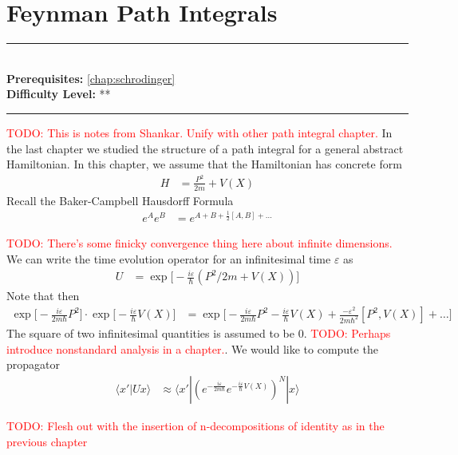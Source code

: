 \documentclass[book.tex]{subfiles}
\begin{document}
\chapter{Feynman Path Integrals}

\label{chap:path_integrals}
\noindent\rule{11cm}{0.4pt} \\
\textbf{Prerequisites:}  \autoref{chap:schrodinger} \\
\textbf{Difficulty Level:} ** \\
\noindent\rule{11cm}{0.4pt}
\vspace{5mm}

\textcolor{red}{TODO: This is notes from Shankar. Unify with other path integral chapter.}
In the last chapter we studied the structure of a path integral for a general abstract Hamiltonian. In this chapter, we assume that the Hamiltonian has concrete form
\begin{align}
    H &= \frac{P^2}{2m} + V(X)
\end{align}
Recall the Baker-Campbell Hausdorff Formula
\begin{align}
    e^{A}e^{B} &= e^{A + B + \frac{1}{2}[A, B]+\dotsc}
\end{align}

\textcolor{red}{TODO: There's some finicky convergence thing here about infinite dimensions.}
We can write the time evolution operator for an infinitesimal time $\varepsilon$ as
\begin{align}
    U &= \exp \Bigg [ -\frac{i\varepsilon}{\hbar} (P^2/2m + V(X)) \Bigg ]
\end{align}
Note that then
\begin{align}
    \exp \Bigg[ -\frac{i\varepsilon}{2m\hbar} P^2 \Bigg ] \cdot \exp \Bigg[ -\frac{i\varepsilon}{\hbar} V(X) \Bigg ]  &= 
    \exp \Bigg [ -\frac{i\varepsilon}{2m\hbar}P^2 - \frac{i\varepsilon}{\hbar}V(X) + \frac{-\varepsilon^2}{2m\hbar^2} [P^2, V(X)] + \dotsc \Bigg ]
\end{align}
The square of two infinitesimal quantities is assumed to be $0$. \textcolor{red}{TODO: Perhaps introduce nonstandard analysis in a chapter.}. We would like to compute the propagator
\begin{align}
\langle x' | U x \rangle &\approx \langle x' | \left (e^{-\frac{i\varepsilon}{2m\hbar}}e^{-\frac{i\varepsilon}{\hbar}V(X)}\right )^N | x \rangle
\end{align}

\textcolor{red}{TODO: Flesh out with the insertion of n-decompositions of identity as in the previous chapter}
\end{document}
